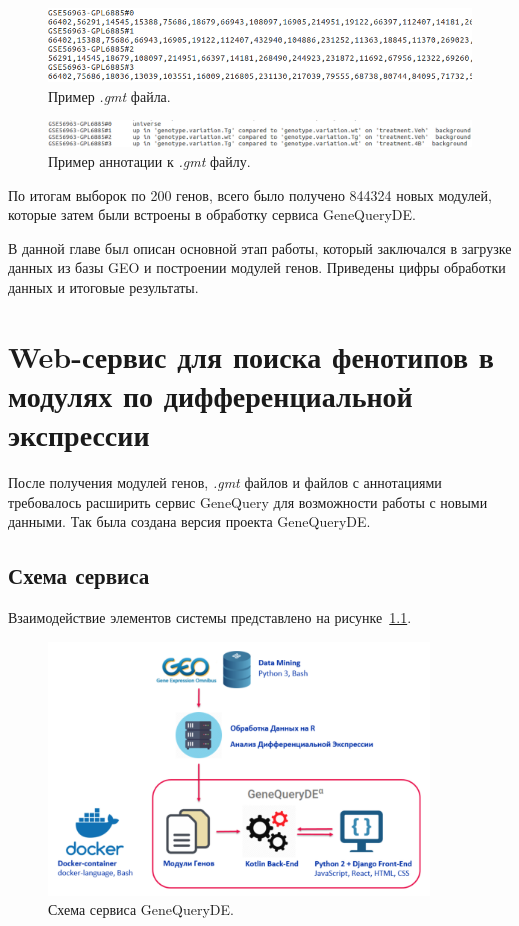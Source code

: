 \documentclass[times,specification,annotation]{itmo-student-thesis}
\begin{document}
\begin{figure}[!h]
    \caption{Пример \textit{.gmt} файла.}\label{gmt}
    \centering
    \includegraphics[width=1\textwidth]{gmt.png}
\end{figure}

\begin{figure}[!h]
    \caption{Пример аннотации к \textit{.gmt} файлу.}\label{annot}
    \centering
    \includegraphics[width=1\textwidth]{gmt_annot.png}
\end{figure}

По итогам выборок по 200 генов, всего было получено 844324 новых модулей, которые затем были встроены в обработку сервиса GeneQueryDE.

\chapterconclusion

В данной главе был описан основной этап работы, который заключался в загрузке данных из базы GEO и построении модулей генов. Приведены цифры обработки данных и итоговые результаты.  


\chapter{Web-сервис для поиска фенотипов в модулях по дифференциальной экспрессии}

После получения модулей генов, \textit{.gmt} файлов и файлов с аннотациями требовалось расширить сервис GeneQuery для возможности работы с новыми данными. Так была создана версия проекта GeneQueryDE. 

\section{Схема сервиса}

Взаимодействие элементов системы представлено на рисунке~\ref{service}. 

\begin{figure}[!h]
    \caption{Схема сервиса GeneQueryDE.}\label{service}
    \centering
    \includegraphics[width=0.9\textwidth]{GeneQueryDE_scheme}
\end{figure}
\end{document}
